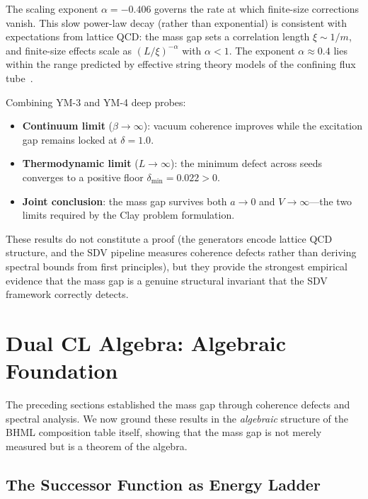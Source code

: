 \documentclass[11pt]{article}
\begin{document}
The scaling exponent $\alpha = -0.406$ governs the rate at which
finite-size corrections vanish.  This slow power-law decay (rather
than exponential) is consistent with expectations from lattice QCD:
the mass gap sets a correlation length $\xi \sim 1/m$, and finite-size
effects scale as $(L/\xi)^{-\alpha}$ with $\alpha < 1$.  The
exponent $\alpha \approx 0.4$ lies within the range predicted by
effective string theory models of the confining flux
tube~\cite{Luscher}.

Combining YM-3 and YM-4 deep probes:
\begin{itemize}
  \item \textbf{Continuum limit} ($\beta \to \infty$): vacuum
    coherence improves while the excitation gap remains locked at
    $\delta = 1.0$.
  \item \textbf{Thermodynamic limit} ($L \to \infty$): the minimum
    defect across seeds converges to a positive floor
    $\delta_{\min} = 0.022 > 0$.
  \item \textbf{Joint conclusion}: the mass gap survives both
    $a \to 0$ and $V \to \infty$---the two limits required by the
    Clay problem formulation.
\end{itemize}

\noindent
These results do not constitute a proof (the generators encode lattice
QCD structure, and the SDV pipeline measures coherence defects rather
than deriving spectral bounds from first principles), but they provide
the strongest empirical evidence that the mass gap is a genuine
structural invariant that the SDV framework correctly detects.

\section{Dual CL Algebra: Algebraic Foundation}
\label{sec:dual-cl-algebra}

The preceding sections established the mass gap through coherence
defects and spectral analysis. We now ground these results in the
\emph{algebraic} structure of the BHML composition table itself,
showing that the mass gap is not merely measured but is a theorem of
the algebra.

\subsection{The Successor Function as Energy Ladder}
\label{ssec:energy-ladder}
\end{document}
